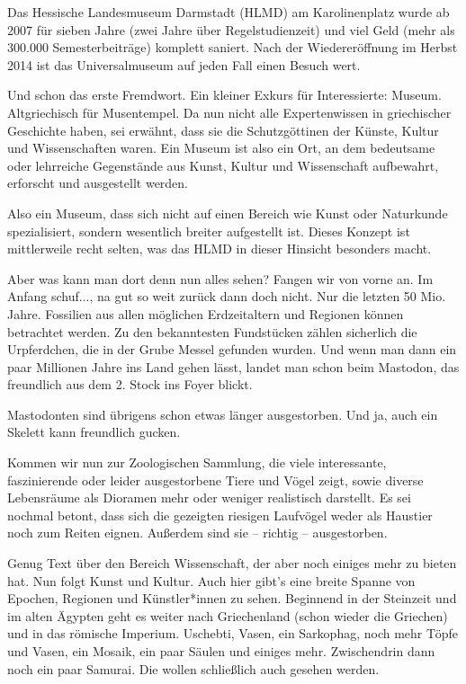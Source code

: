 {Das Hessische Landesmuseum Darmstadt (HLMD) am Karolinenplatz wurde ab 2007 für sieben Jahre (zwei Jahre über Regelstudienzeit) und viel Geld (mehr als 300.000 Semesterbeiträge) komplett saniert. Nach der Wiedereröffnung im Herbst 2014 ist das Universalmuseum auf jeden Fall einen Besuch wert.
}{Und schon das erste Fremdwort. Ein kleiner Exkurs für Interessierte: Museum. Altgriechisch für Musentempel. Da nun nicht alle Expertenwissen in griechischer Geschichte haben, sei erwähnt, dass sie die Schutzgöttinen der Künste, Kultur und Wissenschaften waren. Ein Museum ist also ein Ort, an dem bedeutsame oder lehrreiche Gegenstände aus Kunst, Kultur und Wissenschaft aufbewahrt, erforscht und ausgestellt werden.

    Also ein Museum, dass sich nicht auf einen Bereich wie Kunst oder Naturkunde spezialisiert, sondern wesentlich breiter aufgestellt ist. Dieses Konzept ist mittlerweile recht selten, was das HLMD in dieser Hinsicht besonders macht.

    Aber was kann man dort denn nun alles sehen? Fangen wir von vorne an. Im Anfang schuf..., na gut so weit zurück dann doch nicht. Nur die letzten 50 Mio. Jahre. Fossilien aus allen möglichen Erdzeitaltern und Regionen können betrachtet werden. Zu den bekanntesten Fundstücken zählen sicherlich die Urpferdchen, die in der Grube Messel gefunden wurden. Und wenn man dann ein paar Millionen Jahre ins Land gehen lässt, landet man schon beim Mastodon, das freundlich aus dem 2. Stock ins Foyer blickt.

    Mastodonten sind übrigens schon etwas länger ausgestorben. Und ja, auch ein Skelett kann freundlich gucken.

    Kommen wir nun zur Zoologischen Sammlung, die viele interessante, faszinierende oder leider ausgestorbene Tiere und Vögel zeigt, sowie diverse Lebensräume als Dioramen mehr oder weniger realistisch darstellt. Es sei nochmal betont, dass sich die gezeigten riesigen Laufvögel weder als Haustier noch zum Reiten eignen. Außerdem sind sie -- richtig -- ausgestorben.

    Genug Text über den Bereich Wissenschaft, der aber noch einiges mehr zu bieten hat. Nun folgt Kunst und Kultur. Auch hier gibt's eine breite Spanne von Epochen, Regionen und Künstler*innen zu sehen. Beginnend in der Steinzeit und im alten Ägypten geht es weiter nach Griechenland (schon wieder die Griechen) und in das römische Imperium. Uschebti, Vasen, ein Sarkophag, noch mehr Töpfe und Vasen, ein Mosaik, ein paar Säulen und einiges mehr. Zwischendrin dann noch ein paar Samurai. Die wollen schließlich auch gesehen werden.

}
